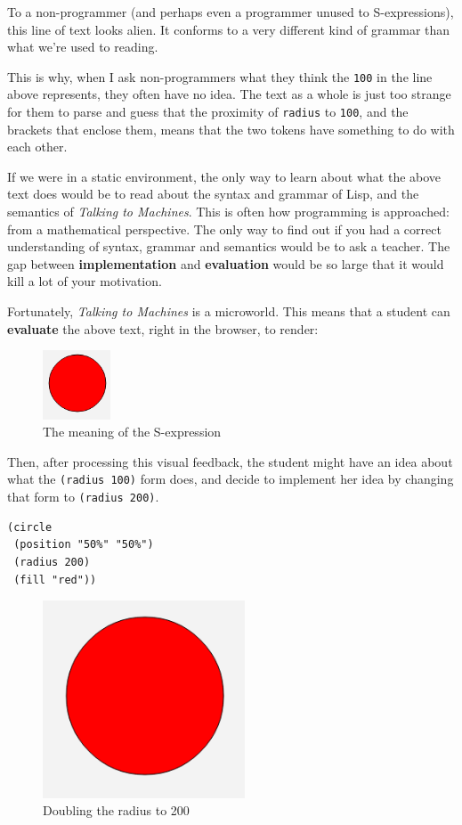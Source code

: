 To a non-programmer (and perhaps even a programmer unused to
S-expressions), this line of text looks alien. It conforms to a very
different kind of grammar than what we're used to reading.

This is why, when I ask non-programmers what they think the \texttt{100} in
the line above represents, they often have no idea. The text as a whole
is just too strange for them to parse and guess that the proximity of
\texttt{radius} to \texttt{100}, and the brackets that enclose them, means that the
two tokens have something to do with each other.

If we were in a static environment, the only way to learn about what the
above text does would be to read about the syntax and grammar of Lisp, and the semantics of \emph{Talking to Machines}.
This is often how programming is approached: from a mathematical
perspective. The only way to find out if you had a correct understanding
of syntax, grammar and semantics would be to ask a teacher. The gap between
\textbf{implementation} and \textbf{evaluation} would be so large that
it would kill a lot of your motivation.

Fortunately, \emph{Talking to Machines} is a microworld. This means that
a student can \textbf{evaluate} the above text, right in the browser, to render:

\begin{figure}[ht!]
\centering
\includegraphics[width=20mm]{img/red_circle.png}
\caption{The meaning of the S-expression}
\label{overflow}
\end{figure}

Then, after processing this visual feedback, the student might have an idea about what the \texttt{(radius 100)} form does, and decide to implement her idea by changing that form to \texttt{(radius 200)}. 

\begin{verbatim}
(circle
 (position "50%" "50%")
 (radius 200)
 (fill "red"))
\end{verbatim}

\begin{figure}[ht!]
\centering
\includegraphics[width=60mm]{img/big_red_circle.png}
\caption{Doubling the radius to 200}
\label{overflow}
\end{figure}

